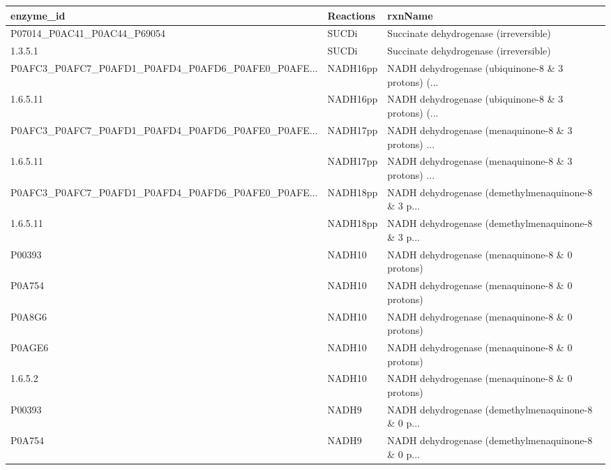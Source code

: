 \begin{tabular}{lll}
\toprule
                                         enzyme\_id &  Reactions &                                            rxnName \\
\midrule
                       P07014\_P0AC41\_P0AC44\_P69054 &      SUCDi &             Succinate dehydrogenase (irreversible) \\
                                           1.3.5.1 &      SUCDi &             Succinate dehydrogenase (irreversible) \\
P0AFC3\_P0AFC7\_P0AFD1\_P0AFD4\_P0AFD6\_P0AFE0\_P0AFE... &   NADH16pp & NADH dehydrogenase (ubiquinone-8 \& 3 protons) (... \\
                                          1.6.5.11 &   NADH16pp & NADH dehydrogenase (ubiquinone-8 \& 3 protons) (... \\
P0AFC3\_P0AFC7\_P0AFD1\_P0AFD4\_P0AFD6\_P0AFE0\_P0AFE... &   NADH17pp & NADH dehydrogenase (menaquinone-8 \& 3 protons) ... \\
                                          1.6.5.11 &   NADH17pp & NADH dehydrogenase (menaquinone-8 \& 3 protons) ... \\
P0AFC3\_P0AFC7\_P0AFD1\_P0AFD4\_P0AFD6\_P0AFE0\_P0AFE... &   NADH18pp & NADH dehydrogenase (demethylmenaquinone-8 \& 3 p... \\
                                          1.6.5.11 &   NADH18pp & NADH dehydrogenase (demethylmenaquinone-8 \& 3 p... \\
                                            P00393 &     NADH10 &     NADH dehydrogenase (menaquinone-8 \& 0 protons) \\
                                            P0A754 &     NADH10 &     NADH dehydrogenase (menaquinone-8 \& 0 protons) \\
                                            P0A8G6 &     NADH10 &     NADH dehydrogenase (menaquinone-8 \& 0 protons) \\
                                            P0AGE6 &     NADH10 &     NADH dehydrogenase (menaquinone-8 \& 0 protons) \\
                                           1.6.5.2 &     NADH10 &     NADH dehydrogenase (menaquinone-8 \& 0 protons) \\
                                            P00393 &      NADH9 & NADH dehydrogenase (demethylmenaquinone-8 \& 0 p... \\
                                            P0A754 &      NADH9 & NADH dehydrogenase (demethylmenaquinone-8 \& 0 p... \\

\end{tabular}
